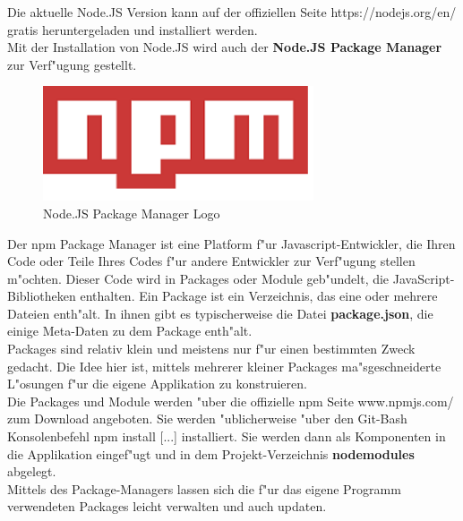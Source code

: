 \documentclass[a4paper, 11pt]{scrreprt}
\begin{document}
Die aktuelle Node.JS Version kann auf der offiziellen Seite https://nodejs.org/en/ gratis heruntergeladen und installiert werden.\\

Mit der Installation von Node.JS wird auch der \textbf{Node.JS Package Manager} zur Verf"ugung gestellt.\\

\begin{figure} [h]
\begin{center}


\includegraphics[width=8cm]{npm.png}
\caption{Node.JS Package Manager Logo}
\label{npm}

\end{center}
\end{figure}


Der npm Package Manager ist eine Platform f"ur Javascript-Entwickler, die Ihren Code oder Teile Ihres Codes f"ur andere Entwickler zur Verf"ugung stellen m"ochten. Dieser Code wird in Packages oder Module geb"undelt, die JavaScript-Bibliotheken enthalten. Ein Package ist ein Verzeichnis, das eine oder mehrere Dateien enth"alt. In ihnen gibt es typischerweise die Datei \textbf{package.json}, die einige Meta-Daten zu dem Package enth"alt. \\

Packages sind relativ klein und meistens nur f"ur einen bestimmten Zweck gedacht. Die Idee hier ist, mittels mehrerer kleiner  Packages ma"sgeschneiderte L"osungen f"ur die eigene Applikation zu konstruieren. \\

Die Packages und Module werden "uber die offizielle npm Seite www.npmjs.com/ zum Download angeboten. Sie werden "ublicherweise "uber den Git-Bash Konsolenbefehl npm install [...] installiert. Sie werden dann als Komponenten in die Applikation eingef"ugt und in dem Projekt-Verzeichnis \textbf{nodemodules} abgelegt.\\

Mittels des Package-Managers lassen sich die f"ur das eigene Programm verwendeten Packages leicht verwalten und auch updaten. \\
\end{document}

